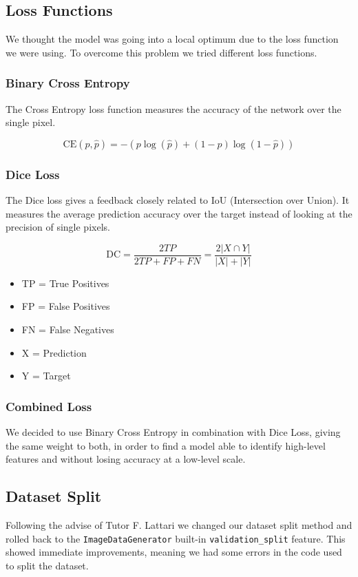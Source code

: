 \documentclass{article}
\begin{document}
		\subsection{Loss Functions}
			
			We thought the model was going into a local optimum due to the loss function we were using. To overcome this problem we tried different loss functions. 
			
			\subsubsection{Binary Cross Entropy}
				
				The Cross Entropy loss function measures the accuracy of the network over the single pixel.
				
				\[\text{CE}\left(p, \hat{p}\right) = -\left(p \log\left(\hat{p}\right) + (1-p) \log\left(1 - \hat{p}\right)\right)\]		
			
			\subsubsection{Dice Loss}
				
				The Dice loss gives a feedback closely related to IoU (Intersection over Union). It measures the average prediction accuracy over the target instead of looking at the precision of single pixels.
			
				\[\text{DC} = \frac{2 TP}{2 TP + FP + FN} = \frac{2|X \cap Y|}{|X| + |Y|}\]
				
				\begin{itemize}
					\item TP = True Positives
					\item FP = False Positives
					\item FN = False Negatives
					\item X = Prediction
					\item Y = Target
				\end{itemize}
			
			\subsubsection{Combined Loss}
				We decided to use Binary Cross Entropy in combination with Dice Loss, giving the same weight to both, in order to find a model able to identify high-level features and without losing accuracy at a low-level scale.
				
		\subsection{Dataset Split}
			Following the advise of Tutor F. Lattari we changed our dataset split method and rolled back to the \texttt{ImageDataGenerator} built-in \texttt{validation\_split} feature. This showed immediate improvements, meaning we had some errors in the code used to split the dataset. 
		
\end{document}
